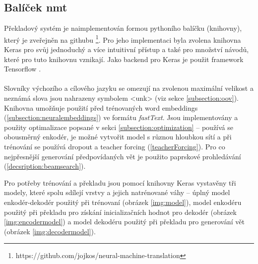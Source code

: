\subsection{Balíček nmt}
Překladový systém je naimplementován formou pythoního balíčku (knihovny), který je zveřejněn na githubu \footnote{https://github.com/jojkos/neural-machine-translation}. Pro jeho implementaci byla zvolena knihovna Keras \cite{keras} pro svůj jednoduchý a více intuitivní přístup a také pro množství návodů, které pro tuto knihovnu vznikají. Jako backend pro Keras je použit framework Tensorflow \cite{tensorflow}.
\\\\
Slovníky výchozího a cílového jazyku se omezují na zvolenou maximální velikost a neznámá slova jsou nahrazeny symbolem <unk> (viz sekce \ref{subsection:oov}). Knihovna umožňuje použití před trénovaných word embeddings (\ref{subsection:neuralembeddings}) ve formátu \emph{fastText}. Jsou implementovány a použity optimalizace popsané v sekci \ref{subsection:optimization} -- používá se obousměrný enkodér, je možné vytvořit model s různou hloubkou sítí a při trénování se používá dropout a teacher forcing (\ref{teacherForcing}). Pro co nejpřesnější generování předpovídaných vět je použito paprskové prohledávání (\ref{decsription:beamsearch}).

Pro potřeby trénování a překladu jsou pomocí knihovny Keras vystavěny tři modely, které spolu sdílejí vrstvy a jejich natrénované váhy -- úplný model enkodér-dekodér použitý při trénovaní (obrázek \ref{img:model}), model enkodéru použitý při překladu pro získání inicializačních hodnot pro dekodér (obrázek \ref{img:encodermodel}) a model dekodéru použitý při překladu pro generování vět (obrázek \ref{img:decodermodel}).



